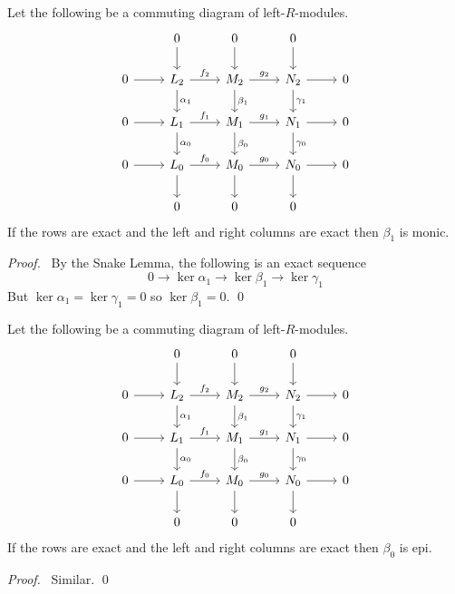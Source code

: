 \begin{prop}
Let the following be a commuting diagram of left-$R$-modules.
\[ \begin{tikzcd}
& 0 \arrow[d] & 0 \arrow[d] & 0 \arrow[d] \\
0 \arrow[r] & L_2 \arrow[r,"f_2"] \arrow[d,"\alpha_1"] & M_2 \arrow[r,"g_2"] \arrow[d,"\beta_1"] & N_2 \arrow[r] \arrow[d,"\gamma_1"] & 0 \\
0 \arrow[r] & L_1 \arrow[r,"f_1"] \arrow[d,"\alpha_0"] & M_1 \arrow[r,"g_1"] \arrow[d,"\beta_0"] & N_1 \arrow[r] \arrow[d,"\gamma_0"] & 0 \\
0 \arrow[r] & L_0 \arrow[r,"f_0"] \arrow[d] & M_0 \arrow[r,"g_0"] \arrow[d] & N_0 \arrow[r] \arrow[d] & 0 \\
& 0 & 0 & 0
\end{tikzcd} \]
If the rows are exact and the left and right columns are exact then $\beta_1$ is monic.
\end{prop}

\begin{proof}
\pf\ By the Snake Lemma, the following is an exact sequence
\[ 0 \rightarrow \ker \alpha_1 \rightarrow \ker \beta_1 \rightarrow \ker \gamma_1 \]
But $\ker \alpha_1 = \ker \gamma_1 = 0$ so $\ker \beta_1 = 0$. \qed
\end{proof}

\begin{prop}
Let the following be a commuting diagram of left-$R$-modules.
\[ \begin{tikzcd}
& 0 \arrow[d] & 0 \arrow[d] & 0 \arrow[d] \\
0 \arrow[r] & L_2 \arrow[r,"f_2"] \arrow[d,"\alpha_1"] & M_2 \arrow[r,"g_2"] \arrow[d,"\beta_1"] & N_2 \arrow[r] \arrow[d,"\gamma_1"] & 0 \\
0 \arrow[r] & L_1 \arrow[r,"f_1"] \arrow[d,"\alpha_0"] & M_1 \arrow[r,"g_1"] \arrow[d,"\beta_0"] & N_1 \arrow[r] \arrow[d,"\gamma_0"] & 0 \\
0 \arrow[r] & L_0 \arrow[r,"f_0"] \arrow[d] & M_0 \arrow[r,"g_0"] \arrow[d] & N_0 \arrow[r] \arrow[d] & 0 \\
& 0 & 0 & 0
\end{tikzcd} \]
If the rows are exact and the left and right columns are exact then $\beta_0$ is epi.
\end{prop}

\begin{proof}
\pf\ Similar. \qed
\end{proof}

